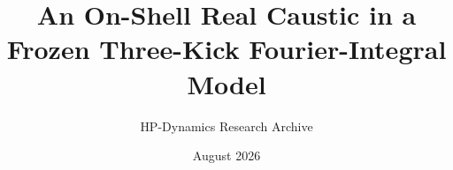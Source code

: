 \documentclass[11pt]{article}
\title{An On-Shell Real Caustic in a Frozen Three-Kick Fourier-Integral Model}
\author{HP-Dynamics Research Archive}
\date{August 2026}
\theoremstyle{definition}
\begin{document}
\maketitle

\begin{abstract}

\end{abstract}








\appendix

\end{document}
